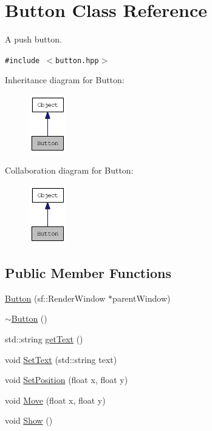 \hypertarget{classButton}{
\section{Button Class Reference}
\label{classButton}
}
A push button.  


{\tt \#include $<$button.hpp$>$}

Inheritance diagram for Button:\nopagebreak
\begin{figure}[H]
\begin{center}
\leavevmode
\includegraphics[width=46pt]{classButton__inherit__graph}
\end{center}
\end{figure}
Collaboration diagram for Button:\nopagebreak
\begin{figure}[H]
\begin{center}
\leavevmode
\includegraphics[width=46pt]{classButton__coll__graph}
\end{center}
\end{figure}
\subsection*{Public Member Functions}
\begin{CompactItemize}
\item 
\hyperlink{classButton_f803adbf034e7b365b563ac1c837bf60}{Button} (sf::RenderWindow $\ast$parentWindow)
\item 
\hyperlink{classButton_2a001eb9c3cc8ae54768a850dd345002}{$\sim$Button} ()
\item 
std::string \hyperlink{classButton_fd57748d0bd0f5fa35d765052d281169}{getText} ()
\item 
void \hyperlink{classButton_e27547f223b15252190703b02631fe6e}{SetText} (std::string text)
\item 
void \hyperlink{classButton_1eca1f2d8b1948d54f6962a303773432}{SetPosition} (float x, float y)
\item 
void \hyperlink{classButton_4e1a77ff60e992d02841cd6de1585e2d}{Move} (float x, float y)
\item 
void \hyperlink{classButton_eb5dc1523ca4a12aea9be762abbeadda}{Show} ()
\end{CompactItemize}
